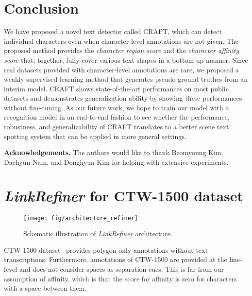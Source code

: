 \documentclass[10pt,twocolumn,letterpaper]{article}
\begin{document}
 \section{Conclusion}
We have proposed a novel text detector called CRAFT, which can detect individual characters even when character-level annotations are not given. The proposed method provides the \textit{character region score} and the \textit{character affinity score} that, together, fully cover various text shapes in a bottom-up manner. Since real datasets provided with character-level annotations are rare, we proposed a weakly-supervised learning method that generates pseudo-ground truthes from an interim model.
CRAFT shows state-of-the-art performances on most public datasets and demonstrates generalization ability by showing these performances without fine-tuning. 
As our future work, we hope to train our model with a recognition model in an end-to-end fashion to see whether the performance, robustness, and generalizability of CRAFT translates to a better scene text spotting system that can be applied in more general settings.
 

\vspace{2mm}
\noindent\textbf{Acknowledgements.} The authors would like to thank Beomyoung Kim, Daehyun Nam, and Donghyun Kim for helping with extensive experiments.

{\small


}

\clearpage
\appendix

\section{\textit{LinkRefiner} for CTW-1500 dataset}

\begin{figure}[h]
	\begin{center}
        \texttt{[image: fig/architecture\_refiner]}
         \vspace{+1mm}
        \caption{Schematic illustration of \textit{LinkRefiner} architecture.}
  	    \label{fig:architecture_refiner} 
    \end{center}
     \vspace{-1.5mm}
\end{figure}


CTW-1500 dataset~\cite{yuliang2017detecting} provides polygon-only annotations without text transcriptions. Furthermore, annotations of CTW-1500 are provided at the line-level and does not consider spaces as separation cues. This is far from our assumption of affinity, which is that the score for affinity is zero for characters with a space between them.
\end{document}
